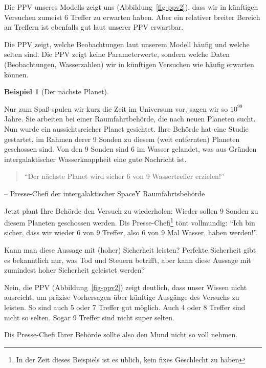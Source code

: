 \documentclass[
  a4paper,
  DIV=11]{scrreprt}
\theoremstyle{definition}
\newtheorem{example}{Beispiel}[chapter]
\theoremstyle{remark}
\begin{document}
Die PPV unseres Modells zeigt uns (Abbildung~\ref{fig-ppv2}), dass wir
in künftigen Versuchen zumeist 6 Treffer zu erwarten haben. Aber ein
relativer breiter Bereich an Treffern ist ebenfalls gut laut unserer PPV
erwartbar.

\begin{tcolorbox}[enhanced jigsaw, title=\textcolor{quarto-callout-important-color}{\faExclamation}\hspace{0.5em}{Wichtig}, bottomtitle=1mm, bottomrule=.15mm, titlerule=0mm, colbacktitle=quarto-callout-important-color!10!white, colframe=quarto-callout-important-color-frame, leftrule=.75mm, left=2mm, toprule=.15mm, colback=white, arc=.35mm, breakable, toptitle=1mm, opacityback=0, rightrule=.15mm, coltitle=black, opacitybacktitle=0.6]

Die PPV zeigt, welche Beobachtungen laut unserem Modell häufig und
welche selten sind. Die PPV zeigt keine Parameterwerte, sondern welche
Daten (Beobachtungen, Wasserzahlen) wir in künftigen Versuchen wie
häufig erwarten können.

\end{tcolorbox}

\leavevmode{}%
\begin{example}[Der nächste Planet]\label{exm-ppv1}

Nur zum Spaß spulen wir kurz die Zeit im Universum vor, sagen wir so
\(10^{99}\) Jahre. Sie arbeiten bei einer Raumfahrtbehörde, die nach
neuen Planeten sucht. Nun wurde ein aussichtsreicher Planet gesichtet.
Ihre Behörde hat eine Studie gestartet, im Rahmen derer 9 Sonden zu
diesem (weit entfernten) Planeten geschossen sind. Von den 9 Sonden sind
6 im Wasser gelandet, was aus Gründen intergalaktischer Wasserknappheit
eine gute Nachricht ist.

\begin{quote}
``Der nächste Planet wird sicher 6 von 9 Wassertreffer erzielen!''
\end{quote}

-- Presse-Chefi der intergalaktischer SpaceY Raumfahrtsbehörde

Jetzt plant Ihre Behörde den Versuch zu wiederholen: Wieder sollen 9
Sonden zu diesem Planeten geschossen werden. Dis Presse-Chefi\footnote{In
  der Zeit dieses Beispiels ist es üblich, kein fixes Geschlecht zu
  haben} tönt vollmundig: ``Ich bin sicher, dass wir wieder 6 von 9
Treffer, also 6 von 9 Mal Wasser, haben werden!''.

Kann man diese Aussage mit (hoher) Sicherheit leisten? Perfekte
Sicherheit gibt es bekanntlich nur, was Tod und Steuern betrifft, aber
kann diese Aussage mit zumindest hoher Sicherheit geleistet werden?

Nein, die PPV (Abbildung~\ref{fig-ppv2}) zeigt deutlich, dass unser
Wissen nicht ausreicht, um präzise Vorhersagen über künftige Ausgänge
des Versuchs zu leisten. So sind auch 5 oder 7 Treffer gut möglich. Auch
4 oder 8 Treffer sind nicht so selten. Sogar 9 Treffer sind nicht super
selten.

Dis Presse-Chefi Ihrer Behörde sollte also den Mund nicht so voll
nehmen.

\end{example}
\end{document}
